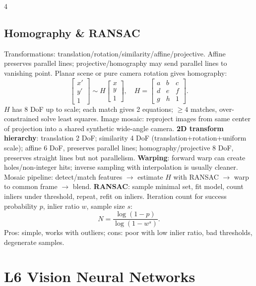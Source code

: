 \documentclass[8pt,a4paper,landscape]{extarticle}
\newcommand{\key}[1]{\textbf{#1}}
\begin{document}
\begin{multicols*}{4}
\subsection{Homography \& RANSAC}
Transformations: translation/rotation/similarity/affine/projective. Affine preserves parallel lines; projective/homography may send parallel lines to vanishing point. Planar scene or pure camera rotation gives homography:
\[
\begin{bmatrix}x'\\y'\\1\end{bmatrix}\sim
H\begin{bmatrix}x\\y\\1\end{bmatrix},\quad
H=\begin{bmatrix}a&b&c\\d&e&f\\g&h&1\end{bmatrix}.
\]
$H$ has 8 DoF up to scale; each match gives 2 equations; $\ge4$ matches, over-constrained solve least squares. Image mosaic: reproject images from same center of projection into a shared synthetic wide-angle camera.
\key{2D transform hierarchy}: translation 2 DoF; similarity 4 DoF (translation+rotation+uniform scale); affine 6 DoF, preserves parallel lines; homography/projective 8 DoF, preserves straight lines but not parallelism. \key{Warping}: forward warp can create holes/non-integer hits; inverse sampling with interpolation is usually cleaner. Mosaic pipeline: detect/match features $\to$ estimate $H$ with RANSAC $\to$ warp to common frame $\to$ blend.
\key{RANSAC}: sample minimal set, fit model, count inliers under threshold, repeat, refit on inliers. Iteration count for success probability $p$, inlier ratio $w$, sample size $s$:
\[
N=\frac{\log(1-p)}{\log(1-w^s)}.
\]
Pros: simple, works with outliers; cons: poor with low inlier ratio, bad thresholds, degenerate samples.

\section{L6 Vision Neural Networks}

\end{multicols*}
\end{document}
